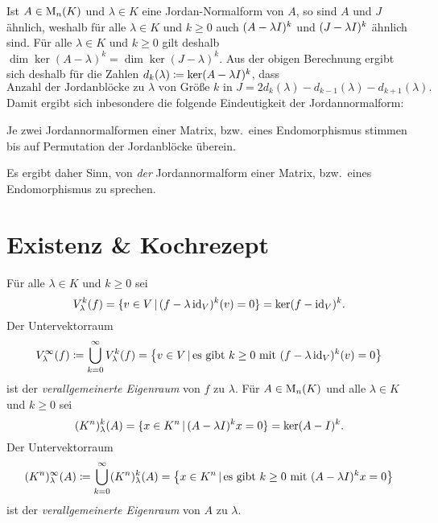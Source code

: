 Ist $A \in \matrices{n}{K}$ und $\lambda \in K$ eine Jordan-Normalform von $A$, so sind $A$ und $J$ ähnlich, weshalb für alle $\lambda \in K$ und $k \geq 0$ auch $(A - \lambda \Id)^k$ und $(J - \lambda \Id)^k$ ähnlich sind.
Für alle $\lambda \in K$ und $k \geq 0$ gilt deshalb $\dim \ker (A - \lambda)^k = \dim \ker (J - \lambda)^k$.
Aus der obigen Berechnung ergibt sich deshalb für die Zahlen $d_k(\lambda) \coloneqq \ker (A - \lambda \Id)^k$, dass
\[
    \text{Anzahl der Jordanblöcke zu $\lambda$ von Größe $k$ in $J$}
  = 2 d_k(\lambda) - d_{k-1}(\lambda) - d_{k+1}(\lambda).
\]
Damit ergibt sich inbesondere die folgende Eindeutigkeit der Jordannormalform:

\begin{proposition}
  Je zwei Jordannormalformen einer Matrix, bzw.\ eines Endomorphismus stimmen bis auf Permutation der Jordanblöcke überein.
\end{proposition}

Es ergibt daher Sinn, von \emph{der} Jordannormalform einer Matrix, bzw.\ eines Endomorphismus zu sprechen.





\section{Existenz \& Kochrezept}

\begin{definition}
  Für alle $\lambda \in K$ und $k \geq 0$ sei
  \[
      \heigenspace{V}{f}{\lambda}{k}
    = \{ v \in V \suchthat (f - \lambda \id_V)^k(v) = 0 \}
    = \ker (f - \id_V)^k.
  \]
  Der Untervektorraum
  \[
              \geigenspace{V}{f}{\lambda}
    \coloneqq \bigcup_{k=0}^\infty \heigenspace{V}{f}{\lambda}{k}
    =         \left\{
                v \in V
              \suchthat
                \text{es gibt $k \geq 0$ mit $(f - \lambda \id_V)^k(v) = 0$}
              \right\}
  \]
  ist der \emph{verallgemeinerte Eigenraum} von $f$ zu $\lambda$.
  Für $A \in \matrices{n}{K}$ und alle $\lambda \in K$ und $k \geq 0$ sei
  \[
      \heigenspace{(K^n)}{A}{\lambda}{k}
    = \{ x \in K^n \suchthat (A - \lambda \Id)^k x = 0 \}
    = \ker (A - \Id)^k.
  \]
  Der Untervektorraum
  \[
              \geigenspace{(K^n)}{A}{\lambda}
    \coloneqq \bigcup_{k=0}^\infty \heigenspace{(K^n)}{A}{\lambda}{k}
    =         \left\{
                x \in K^n
              \suchthat
                \text{es gibt $k \geq 0$ mit $(A - \lambda \Id)^k x = 0$}
              \right\}
  \]
  ist der \emph{verallgemeinerte Eigenraum} von $A$ zu $\lambda$.
\end{definition}

